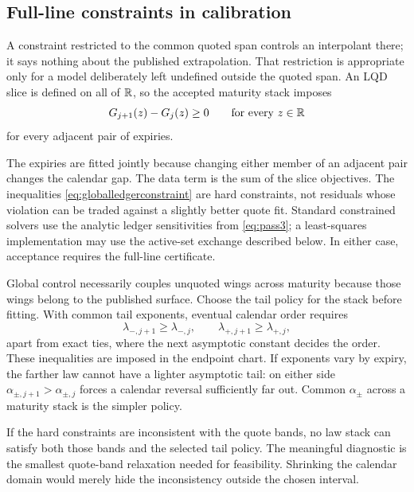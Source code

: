 \subsection{Full-line constraints in calibration}
\label{sec:globalcalendarfit}

A constraint restricted to the common quoted span controls an interpolant
there; it says nothing about the published extrapolation.  That restriction is
appropriate only for a model deliberately left undefined outside the quoted
span.  An LQD slice is defined on all of $\mathbb{R}$, so the accepted maturity stack
imposes
\begin{equation}
G_{j+1}(z)-G_j(z)\ge0
\qquad\text{for every }z\in\mathbb{R}
\label{eq:globalledgerconstraint}
\end{equation}
for every adjacent pair of expiries.

The expiries are fitted jointly because changing either member of an adjacent
pair changes the calendar gap.  The data term is the sum of the slice
objectives.  The inequalities \eqref{eq:globalledgerconstraint} are hard
constraints, not residuals whose violation can be traded against a slightly
better quote fit.  Standard constrained solvers use the analytic ledger
sensitivities from \eqref{eq:pass3}; a least-squares implementation may use the
active-set exchange described below.  In either case, acceptance requires the
full-line certificate.

Global control necessarily couples unquoted wings across maturity because
those wings belong to the published surface.  Choose the tail policy for the
stack before fitting.  With common tail exponents, eventual calendar order
requires
\begin{equation}
\lambda_{-,j+1}\ge\lambda_{-,j},
\qquad
\lambda_{+,j+1}\ge\lambda_{+,j},
\label{eq:tailscalecalendar}
\end{equation}
apart from exact ties, where the next asymptotic constant decides the order.
These inequalities are imposed in the endpoint chart.  If exponents vary by
expiry, the farther law cannot have a lighter asymptotic tail: on either side
$\alpha_{\pm,j+1}>\alpha_{\pm,j}$ forces a calendar reversal sufficiently far
out.  Common $\alpha_\pm$ across a maturity stack is the simpler policy.

If the hard constraints are inconsistent with the quote bands, no law stack
can satisfy both those bands and the selected tail policy.  The meaningful
diagnostic is the smallest quote-band relaxation needed for feasibility.
Shrinking the calendar domain would merely hide the inconsistency outside the
chosen interval.

